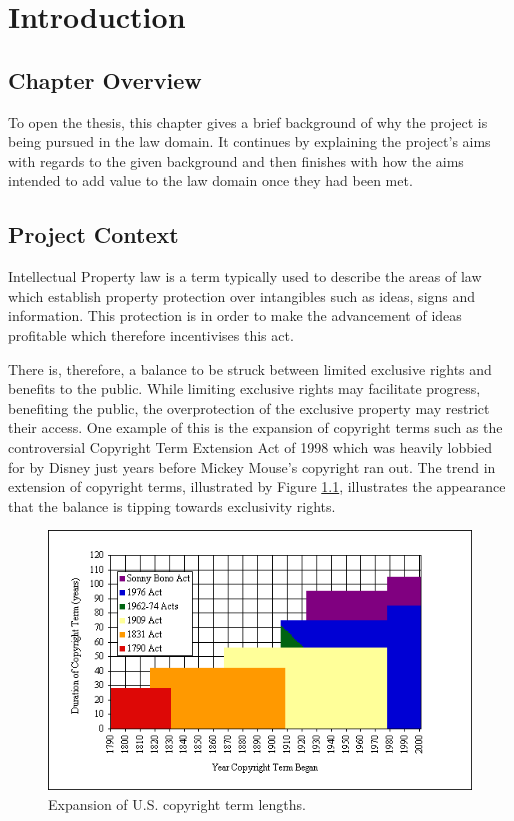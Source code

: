 \chapter{Introduction}
	\section{Chapter Overview}
		To open the thesis, this chapter gives a brief background of why the project is being pursued in the law domain. It continues by explaining the project's aims with regards to the given background and then finishes with how the aims intended to add value to the law domain once they had been met. 
	\section{Project Context}
		Intellectual Property law is a term typically used to describe the areas of law which establish property protection over intangibles such as ideas, signs and information. This protection is in order to make the advancement of ideas profitable which therefore incentivises this act\cite{ip_edu_bently}.
			
		There is, therefore, a balance to be struck between limited exclusive rights and benefits to the public. While limiting exclusive rights may facilitate progress, benefiting the public, the overprotection of the exclusive property may restrict their access\cite{handbook_ip_hr_geiger}. One example of this is the expansion of copyright terms such as the controversial Copyright Term Extension Act of 1998 which was heavily lobbied for by Disney just years before Mickey Mouse's copyright ran out\cite{mickey_mouse_grzelak}. The trend in extension of copyright terms, illustrated by Figure \ref{fig:ext_us_cop}, illustrates the appearance that the balance is tipping towards exclusivity rights. 

		\begin{figure}[h]
    		\centering
    		\includegraphics[width=0.5\linewidth]{resources/images/extention_of_us_copyright.png}
    		\caption{Expansion of U.S. copyright term lengths\cite{copyright_term_length_graph_bell}.}
    		\label{fig:ext_us_cop}
		\end{figure}
			
